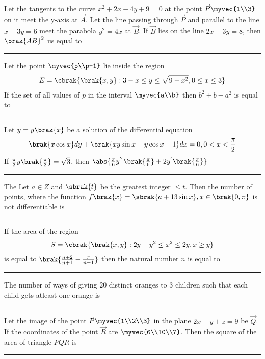 \iffalse
    \title{2023}
    \author{EE24BTECH11005}
    \section{integer}
\fi 
\item Let the tangents to the curve $x^2+2x-4y+9=0$ at the point $\vec{P}\myvec{1\\3}$ on it meet the y-axis at $\vec{A}$. Let the line passing through $\vec{P}$ and parallel to the line $x-3y=6$ meet the parabola $y^2=4x$ at $\vec{B}$. If $\vec{B}$ lies on the line $2x-3y=8$, then $\brak{AB}^2$ us equal to \rule{2cm}{0.2pt}\hfill{}
		\item Let the point $\myvec{p\\p+1}$ lie inside the region 
			\begin{align*}
				E=\cbrak{\brak{x,y}: 3-x \le y \le \sqrt{9-x^2}, 0 \le x \le 3}
			\end{align*}
		If the set of all values of $p$ in the interval $\myvec{a\\b}$ then $b^2+b-a^2$ is equal to \rule{2cm}{0.2pt}\hfill{}
	\item Let $y=y\brak{x}$ be a solution of the differential equation 
		\begin{align*}
			\brak{x\cos x}dy+\brak{xy\sin x +y\cos x-1}dx=0,0<x<\frac{\pi}{2}
		\end{align*}
		If $\frac{\pi}{3}y\brak{\frac{\pi}{3}}=\sqrt{3}$, then $\abs{\frac{\pi}{6}y^{''}\brak{\frac{\pi}{6}}+2y^{'}\brak{\frac{\pi}{6}}}$\rule{2cm}{0.2pt}\hfill{}
	\item The Let $a \in Z$ and $\sbrak{t}$ be the greatest integer $\le t$. Then the number of points, where the function $f\brak{x}=\sbrak{a+13\sin x}, x\in\brak{0,\pi}$ is not differentiable is\rule{2cm}{0.2pt}\hfill{}
	\item If the area of the region 
		\begin{align*}
			S=\cbrak{\brak{x,y}:2y-y^2 \le x^2 \le 2y, x \ge y}
		\end{align*}
		is equal to $\brak{\frac{n+2}{n+1}-\frac{\pi}{n-1}}$ then the natural number $n$ is equal to \rule{2cm}{0.2pt}\hfill{}
	\item The number of ways of giving $20$ distinct oranges to $3$ children such that each child gets atleast one orange is \rule{2cm}{0.2pt}\hfill{}
	\item Let the image of the point $\vec{P}\myvec{1\\2\\3}$ in the plane $2x-y+z=9$ be $\vec{Q}$. If the coordinates of the point $\vec{R}$ are $\myvec{6\\10\\7}$. Then the square of the area of triangle $PQR$ is \rule{2cm}{0.2pt}\hfill{}
